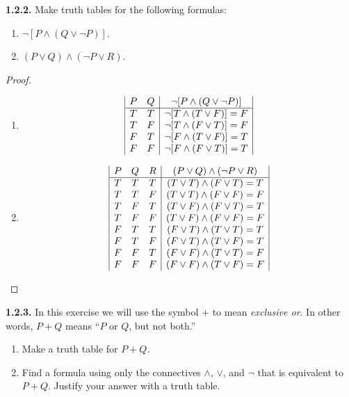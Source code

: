 \documentclass[12pt]{amsart}
\newenvironment{statement}[1]{\smallskip\noindent\color[rgb]{.6627, .3529, .6314} {\bf #1.}}{}
\theoremstyle{definition}
\theoremstyle{remark}
\begin{document}
\begin{statement}{1.2.2}
Make truth tables for the following formulas:
\begin{enumerate}
	\item $\neg [P \wedge (Q \vee \neg P)]$.
	\item $(P \vee Q) \wedge (\neg P \vee R)$.
\end{enumerate}
\end{statement}

\begin{proof}
\hfill
\begin{enumerate}
	\item 
	\begin{equation*}
		\begin{array}{| c c | c |}
			P & Q & \neg [P \wedge (Q \vee \neg P)] \\
			\hline
			T & T & \neg [T \wedge (T \vee F)] = F \\
			T & F & \neg [T \wedge (F \vee T)] = F \\
			F & T & \neg [F \wedge (T \vee F)] = T \\
			F & F & \neg [F \wedge (F \vee T)] = T
		\end{array}
	\end{equation*}
	
	\item 
	\begin{equation*}
		\begin{array}{| c c c | c |}
			P & Q & R & (P \vee Q) \wedge (\neg P \vee R) \\
			\hline
			T & T & T & (T \vee T) \wedge (F \vee T) = T \\
			T & T & F & (T \vee T) \wedge (F \vee F) = F \\
			T & F & T & (T \vee F) \wedge (F \vee T) = T \\
			T & F & F & (T \vee F) \wedge (F \vee F) = F \\
			F & T & T & (F \vee T) \wedge (T \vee T) = T \\
			F & T & F & (F \vee T) \wedge (T \vee F) = T \\
			F & F & T & (F \vee F) \wedge (T \vee T) = F \\
			F & F & F & (F \vee F) \wedge (T \vee F) = F
		\end{array}
	\end{equation*}
\end{enumerate}
\end{proof}


\begin{statement}{1.2.3}
In this exercise we will use the symbol $+$ to mean \emph{exclusive or}.
In other words, $P + Q$ means ``$P$ or $Q$, but not both.''
\begin{enumerate}
	\item Make a truth table for $P + Q$.
	\item Find a formula using only the connectives $\wedge$, $\vee$, and $\neg$ that is equivalent to $P + Q$.
	Justify your answer with a truth table.
\end{enumerate}
\end{statement}
\end{document}
